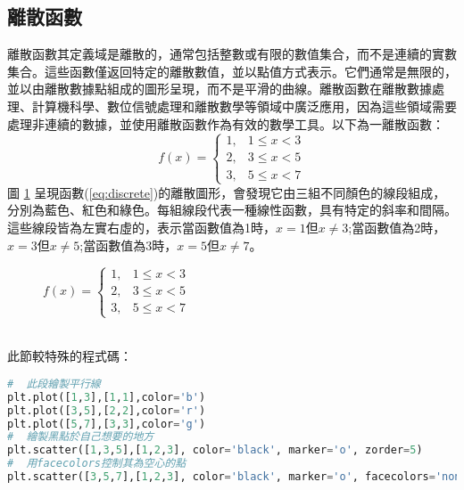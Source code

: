 \subsection{離散函數}
離散函數其定義域是離散的，通常包括整數或有限的數值集合，而不是連續的實數集合。這些函數僅返回特定的離散數值，並以點值方式表示。它們通常是無限的，並以由離散數據點組成的圖形呈現，而不是平滑的曲線。離散函數在離散數據處理、計算機科學、數位信號處理和離散數學等領域中廣泛應用，因為這些領域需要處理非連續的數據，並使用離散函數作為有效的數學工具。以下為一離散函數：
\begin{equation}\label{eq:discrete}
f(x) = \begin{cases}1, & 1 \leq x < 3 \\2, &3 \leq x < 5 \\3, &5 \leq x < 7 \end{cases}
\end{equation}
圖 \ref{fig:discrete} 呈現函數(\ref{eq:discrete})的離散圖形，會發現它由三組不同顏色的線段組成，分別為藍色、紅色和綠色。每組線段代表一種線性函數，具有特定的斜率和間隔。這些線段皆為左實右虛的，表示當函數值為1時，$x=1$但$x\neq 3$;當函數值為2時，$x=3$但$x\neq 5$;當函數值為3時，$x=5$但$x\neq 7$。\\
\begin{figure}[h]
    \caption{$f(x) = \begin{cases}1, & 1 \leq x < 3 \\2, &3 \leq x < 5 \\3, &5 \leq x < 7 \end{cases}$}
    \label{fig:discrete}
\end{figure}\\
此節較特殊的程式碼：
\begin{lstlisting}[language=Python]
#  此段繪製平行線
plt.plot([1,3],[1,1],color='b')
plt.plot([3,5],[2,2],color='r')
plt.plot([5,7],[3,3],color='g')
#  繪製黑點於自己想要的地方
plt.scatter([1,3,5],[1,2,3], color='black', marker='o', zorder=5)
#  用facecolors控制其為空心的點
plt.scatter([3,5,7],[1,2,3], color='black', marker='o', facecolors='none' ,s=50)
\end{lstlisting}
